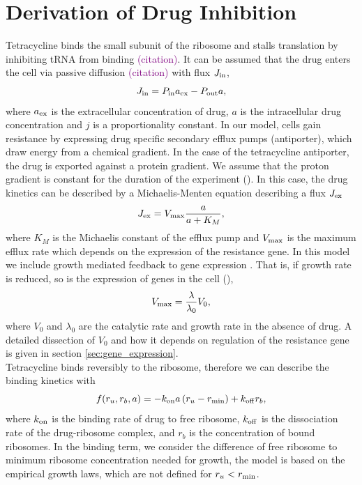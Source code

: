 \section{Derivation of Drug Inhibition}
\label{sec:drug_inhib}
Tetracycline binds the small subunit of the ribosome and stalls translation by inhibiting tRNA from binding \textcolor{purple}{(citation)}. It can be assumed that the drug enters the cell via passive diffusion \textcolor{purple}{(citation)} with flux $J_{\mathrm{in}}$,
\begin{equation}
    J_{\mathrm{in}} = P_{\mathrm{in}} a_{\mathrm{ex}} - P_{\mathrm{out}} a,
\end{equation}
where $a_{\mathrm{ex}}$ is the extracellular concentration of drug, $a$ is the intracellular drug concentration and $j$ is a proportionality constant. In our model, cells gain resistance by expressing drug specific secondary efflux pumps (antiporter), which draw energy from a chemical gradient. In the case of the tetracycline antiporter, the drug is exported against a protein gradient. We assume that the proton gradient is constant for the duration of the experiment (). In this case, the drug kinetics can be described by a Michaelis-Menten equation describing a flux $J_{\mathrm{ex}}$
\begin{equation}
J_{\mathrm{ex}} = V_{\mathrm{max}} {a \over a+K_M},
\end{equation}
where $K_M$ is the Michaelis constant of the efflux pump and $V_{\mathrm{max}}$ is the maximum efflux rate which depends on the expression of the resistance gene. In this model we include growth mediated feedback to gene expression \cite{Deris2013}. That is, if growth rate is reduced, so is the expression of genes in the cell (),
\begin{equation}
V_{\mathrm{max}} = {\lambda\over\lambda_0} V_0,
\end{equation}
where $V_0$ and $\lambda_0$ are the catalytic rate and growth rate in the absence of drug. A detailed dissection of $V_0$ and how it depends on regulation of the resistance gene is given in section \ref{sec:gene_expression}.\\
Tetracycline binds reversibly to the ribosome, therefore we can describe the binding kinetics with
\begin{equation}
    f(r_u, r_b, a) = -k_{\mathrm{on}}a\,(r_u-r_{\mathrm{min}}) + k_{\mathrm{off}} r_b,
\end{equation}
where $k_{\mathrm{on}}$ is the binding rate of drug to free ribosome, $k_{\mathrm{off}}$ is the dissociation rate of the drug-ribosome complex, and $r_b$ is the concentration of bound ribosomes. In the binding term, we consider the difference of free ribosome to minimum ribosome concentration needed for growth, the model is based on the empirical growth laws, which are not defined for $r_u < r_{\mathrm{min}}$.
